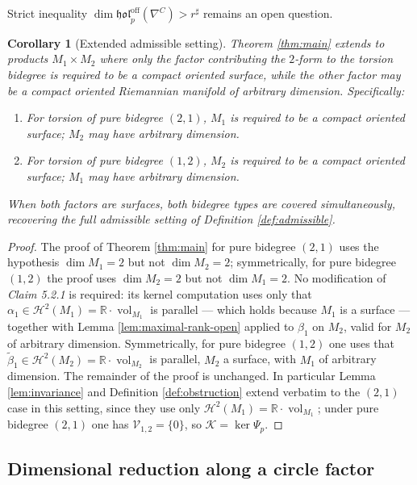 \documentclass[11pt,reqno]{amsart}
\theoremstyle{plain}
\newtheorem{corollary}[theorem]{Corollary}
\theoremstyle{definition}
\numberwithin{equation}{section}
\begin{document}
Strict inequality $\dim\mathfrak{hol}^{\mathrm{off}}_p(\nabla^C) > r^\sharp$ remains an open question.

\begin{corollary}[Extended admissible setting]
\label{cor:extended}
Theorem \ref{thm:main} extends to products 
$M_1 \times M_2$ where only the factor contributing 
the $2$-form to the torsion bidegree is required to 
be a compact oriented surface, while the other factor 
may be a compact oriented Riemannian manifold of 
arbitrary dimension.  Specifically:
\begin{enumerate}
  \item[\textup{(i)}] For torsion of pure bidegree 
    $(2,1)$, $M_1$ is required to be a compact oriented 
    surface; $M_2$ may have arbitrary dimension.
  \item[\textup{(ii)}] For torsion of pure bidegree 
    $(1,2)$, $M_2$ is required to be a compact oriented 
    surface; $M_1$ may have arbitrary dimension.
\end{enumerate}
When both factors are surfaces, both bidegree types are covered simultaneously, recovering the full  admissible setting of 
Definition \ref{def:admissible}.
\end{corollary}

\begin{proof}
The proof of Theorem \ref{thm:main} for pure bidegree 
$(2,1)$ uses the hypothesis $\dim M_1 = 2$ but not 
$\dim M_2 = 2$; symmetrically, for pure bidegree 
$(1,2)$ the proof uses $\dim M_2 = 2$ but not 
$\dim M_1 = 2$.  No modification of \emph{Claim 5.2.1} is required: its kernel computation uses only that $\alpha_1\in\mathcal{H}^2(M_1)=\mathbb{R}\cdot\operatorname{vol}_{M_1}$ is parallel --- which holds because $M_1$ is a surface --- together with Lemma \ref{lem:maximal-rank-open} applied to $\beta_1$ on $M_2$, valid for $M_2$ of
arbitrary dimension. Symmetrically, for pure bidegree $(1,2)$ one uses that $\widetilde\beta_1\in\mathcal{H}^2(M_2)=\mathbb{R}\cdot\operatorname{vol}_{M_2}$ is parallel, $M_2$ a surface, with $M_1$ of arbitrary dimension. The remainder of the proof is unchanged.
In particular Lemma \ref{lem:invariance} and Definition \ref{def:obstruction} extend verbatim to the $(2,1)$ case in this setting, since they use only $\mathcal{H}^2(M_1)=\mathbb{R}\cdot\operatorname{vol}_{M_1}$; under pure bidegree $(2,1)$ one has $\mathcal{V}_{1,2}=\{0\}$, so $\mathcal{K}=\ker\Psi_p$.
\end{proof}

\subsection*{Dimensional reduction along a circle factor}
\end{document}
